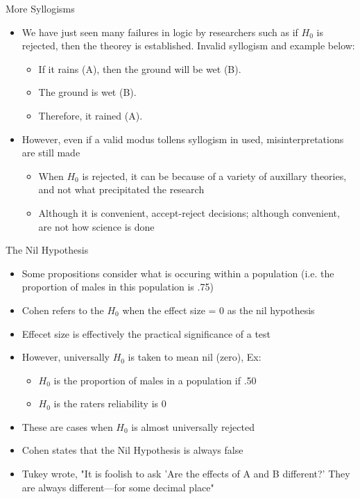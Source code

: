 \documentclass[aspectratio=169, 12pt]{beamer}
\begin{document}
\begin{frame}{More Syllogisms}
  \begin{itemize}
  \item We have just seen many failures in logic by researchers such as if $H_0$ is rejected, then the theorey is established. Invalid syllogism and example below: 
    \begin{itemize}
    \item If it rains (A), then the ground will be wet (B).
    \item The ground is wet (B).
    \item Therefore, it rained (A).
    \end{itemize}
  \item However, even if a valid modus tollens syllogism in used, misinterpretations are still made
    \begin{itemize}
   \item When $H_0$ is rejected, it can be because of a variety of auxillary theories, and not what precipitated the research
   \item Although it is convenient, accept-reject decisions; although convenient, are not how science is done
    \end{itemize}
  \end{itemize}
\end{frame}

\begin{frame}{The Nil Hypothesis}
  \begin{itemize}
  \item Some propositions consider what is occuring within a population (i.e. the proportion of males in this population is .75)
  \item Cohen refers to the $H_0$ when the effect size = 0 as the nil hypothesis
  \item Effecet size is effectively the practical significance of a test
  \item However, universally $H_0$ is taken to mean nil (zero), Ex:
    \begin{itemize}
    \item $H_0$ is the proportion of males in a population if .50
    \item $H_0$ is the raters reliability is 0
    \end{itemize}
  \item These are cases when $H_0$ is almost universally rejected
  \item Cohen states that the Nil Hypothesis is always false %
  \item Tukey wrote, "It is foolish to ask 'Are the effects of A and B different?' They are always different—for some decimal place"
  \end{itemize}
\end{frame}
\end{document}
